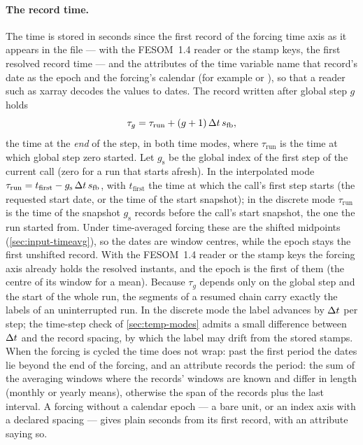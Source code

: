 \paragraph{The record time.} The time is stored in seconds since the first record of the forcing time axis
as it appears in the file --- with the FESOM~1.4 reader or the stamp keys, the first resolved record time ---
and the attributes of the time variable name that record's date as the epoch and
the forcing's calendar (for example  or ), so that a reader such as xarray
decodes the values to dates. The record written after global step $g$ holds
\begin{equation}\label{eq:out-time}
  \tau_g=\tau_{\text{run}}+(g+1)\,\Delta t\,s_{\mathrm{fb}},
\end{equation}
the time at the \emph{end} of the step, in both time modes, where $\tau_{\text{run}}$ is the time at which
global step zero started. Let $g_{\text{s}}$ be the global index of the first step of the current call (zero for
a run that starts afresh). In the interpolated mode $\tau_{\text{run}}=t_{\text{first}}-g_{\text{s}}\,\Delta t\,s_{\mathrm{fb}}$, with
$t_{\text{first}}$ the time at which the call's first step starts (the requested start date, or the time of the
start snapshot); in the discrete mode $\tau_{\text{run}}$ is the time of the snapshot $g_{\text{s}}$ records before
the call's start snapshot, the one the run started from. Under time-averaged forcing these
are the shifted midpoints (\cref{sec:input-timeavg}), so the dates are window centres, while the epoch stays
the first unshifted record. With the FESOM~1.4 reader or the stamp keys the forcing axis already holds the
resolved instants, and the epoch is the first of them (the centre of its window for a mean). Because $\tau_g$ depends only on the global step and the start of the whole run,
the segments of a resumed chain carry exactly the labels of an uninterrupted run. In the discrete mode the
label advances by $\Delta t$ per step; the time-step check of \cref{sec:temp-modes} admits a small difference
between $\Delta t$ and the record spacing, by which the label may drift from the stored stamps. When the forcing is
cycled the time does not wrap: past the first period the dates lie beyond the end of the forcing, and an
attribute records the period: the sum of the averaging windows where the records' windows are known and differ
in length (monthly or yearly means), otherwise the span of the records plus the last interval. A forcing
without a calendar epoch --- a bare unit, or an index axis with a declared spacing --- gives plain seconds from
its first record, with an attribute saying so.

